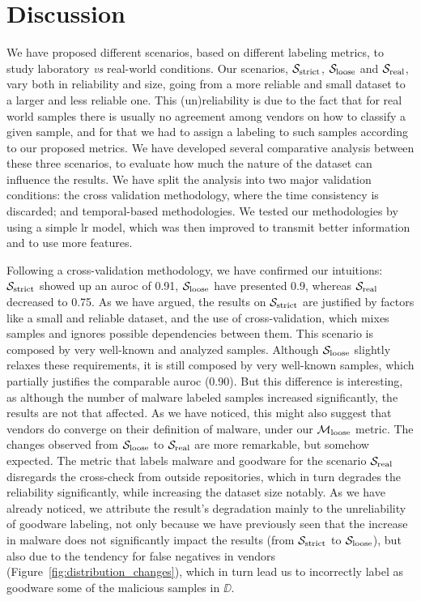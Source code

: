
\section{Discussion}\label{sec:discussion}

We have proposed different scenarios, based on different labeling metrics, to study laboratory \textit{vs} real-world conditions. Our scenarios, $\mathcal{S}_{\mathrm{strict}}$, $\mathcal{S}_{\mathrm{loose}}$ and $\mathcal{S}_{\mathrm{real}}$, vary both in reliability and size, going from a more reliable and small dataset to a larger and less reliable one.
This (un)reliability is due to the fact that for real world samples there is usually no agreement among vendors on how to classify a given sample, and for that we had to assign a labeling to such samples according to our proposed metrics.
We have developed several comparative analysis between these three scenarios, to evaluate how much the nature of the dataset can influence the results.
We have split the analysis into two major validation conditions: the cross validation methodology, where the time consistency is discarded; and temporal-based methodologies.
We tested our methodologies by using a simple \gls{lr} model, which was then improved to transmit better information and to use more features.

Following a cross-validation methodology, we have confirmed our intuitions: $\mathcal{S}_{\mathrm{strict}}$ showed up an \gls{auroc} of 0.91, $\mathcal{S}_{\mathrm{loose}}$ have presented 0.9, whereas $\mathcal{S}_{\mathrm{real}}$ decreased to 0.75. 
As we have argued, the results on $\mathcal{S}_{\mathrm{strict}}$ are justified by factors like a small and reliable dataset, and the use of cross-validation, which mixes samples and ignores possible dependencies between them.
This scenario is composed by very well-known and analyzed samples.
Although $\mathcal{S}_{\mathrm{loose}}$ slightly relaxes these requirements, it is still composed by very well-known samples, which partially justifies the comparable \gls{auroc} (0.90).
But this difference is interesting, as although the number of malware labeled samples increased significantly, the results are not that affected.
As we have noticed, this might also suggest that vendors do converge on their definition of malware, under our $\mathcal{M}_{\mathrm{loose}}$ metric. 
The changes observed from $\mathcal{S}_{\mathrm{loose}}$ to $\mathcal{S}_{\mathrm{real}}$ are more remarkable, but somehow expected.
The metric that labels malware and goodware for the scenario $\mathcal{S}_{\mathrm{real}}$ disregards the cross-check from outside repositories, which in turn degrades the reliability significantly, while increasing the dataset size notably. 
As we have already noticed, we attribute the result's degradation mainly to the unreliability of goodware labeling, not only because we have previously seen that the increase in malware does not significantly impact the results (from $\mathcal{S}_{\mathrm{strict}}$ to $\mathcal{S}_{\mathrm{loose}}$), but also due to the tendency for false negatives in vendors (Figure~\ref{fig:distribution_changes}), which in turn lead us to incorrectly label as goodware some of the malicious samples in $\DD$.

